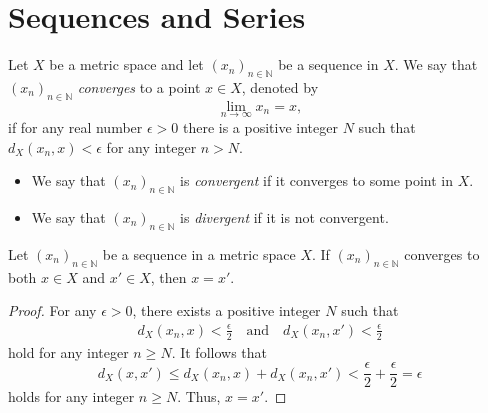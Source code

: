 \chapter{Sequences and Series}
\begin{definition}
  Let $X$ be a metric space and let $(x_n)_{n \in \mathbb{N}}$ be a sequence in
  $X$.
  We say that $(x_n)_{n \in \mathbb{N}}$ \emph{converges} to a point $x \in X$,
  denoted by
  \begin{equation*}
    \lim_{n \to \infty} x_n = x,
  \end{equation*}
  if for any real number $\epsilon > 0$ there is a positive integer $N$
  such that $d_X(x_n, x) < \epsilon$ for any integer $n > N$.
  \begin{itemize}
    \item We say that $(x_n)_{n \in \mathbb{N}}$ is \emph{convergent} if it
    converges to some point in $X$.
    \item We say that $(x_n)_{n \in \mathbb{N}}$ is \emph{divergent} if it is
    not convergent.
  \end{itemize}
\end{definition}

\begin{theorem}
  Let $(x_n)_{n \in \mathbb{N}}$ be a sequence in a metric space $X$.
  If $(x_n)_{n \in \mathbb{N}}$ converges to both $x \in X$ and $x' \in X$,
  then $x = x'$.
\end{theorem}
\begin{proof}
  For any $\epsilon > 0$, there exists a positive integer $N$ such that
  \begin{align*}
    d_X(x_n, x) < \frac{\epsilon}{2}
    \quad \text{and} \quad
    d_X(x_n, x') < \frac{\epsilon}{2}
  \end{align*}
  hold for any integer $n \geq N$.
  It follows that
  \begin{equation*}
    d_X(x, x')
    \leq d_X(x_n, x) + d_X(x_n, x')
    < \frac{\epsilon}{2} + \frac{\epsilon}{2}
    = \epsilon
  \end{equation*}
  holds for any integer $n \geq N$.
  Thus, $x = x'$.
\end{proof}

